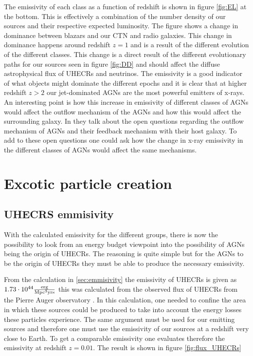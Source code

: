 \documentclass{article}
\begin{document}
The emissivity of each class as a function of redshift is shown in figure \ref*{fig:EL} at the bottom. This is effectively a combination of the number density of our sources and their respective expected luminosity. 
The figure shows a change in dominance between blazars and our CTN and radio galaxies. This change in dominance happens around redshift $z=1$ and is a result of the different evolution of the different classes.
This change is a direct result of the different evolutionary paths for our sources seen in figure \ref*{fig:DD} and should affect the diffuse astrophysical flux of UHECRs and neutrinos. 
The emissivity is a good indicator of what objects might dominate the different epochs and it is clear that at higher redshift $z>2$ our jet-dominated AGNs are the most powerful emitters of x-rays. 
An interesting point is how this increase in emissivity of different classes of AGNs would affect the outflow mechanism of the AGNs and how this would affect the surrounding galaxy. In \cite{Laha_2021}
they talk about the open questions regarding the outflow mechanism of AGNs and their feedback mechanism with their host galaxy. To add to these open questions one could ask how the change in x-ray emissivity in the different classes of AGNs would affect the same mechanisms.



\section{Excotic particle creation}
\subsection{UHECRS emmisivity}
With the calculated emissivity for the different groups, there is now the possibility to look from an energy budget viewpoint into the possibility of AGNs being the origin of UHECRs. The 
reasoning is quite simple but for the AGNs to be the origin of UHECRs they must be able to produce the necessary emissivity. 

From the calculation in \ref{sec:emmisivity} the emissivity of UHECRs is given as $1.73 \cdot 10^{44}\frac{\rm erg}{\rm Mpc^3yr \rm s }$ this was calculated from the observed flux of UHECRs from the Pierre Auger observatory \cite{thepierreaugercollaboration2017pierre}.
In this calculation, one needed to confine the area in which these sources could be produced to take into account the energy losses these particles experience. The same argument must be used 
for our emitting sources and therefore one must use the emissivity of our sources at a redshift very close to Earth. To get a comparable emissivity one evaluates therefore the emissivity at redshift $z=0.01$. The result is shown in figure \ref*{fig:flux_UHECRs}
\end{document}
